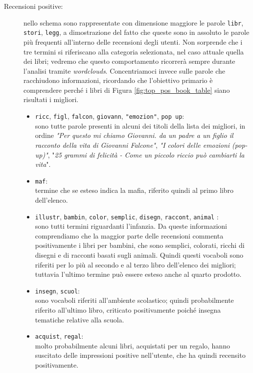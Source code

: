 				\begin{description}
					\item[Recensioni positive:]
					 nello schema sono rappresentate con dimensione maggiore le parole \verb|libr|, \verb|stori|, \verb|legg|, a dimostrazione del fatto che queste sono in assoluto le parole più frequenti all'interno delle recensioni degli utenti. Non sorprende che i tre termini si riferiscano alla categoria selezionata, nel caso attuale quella dei libri; vedremo che questo comportamento ricorrerà sempre durante l'analisi tramite \textit{wordclouds}. Concentriamoci invece sulle parole che racchiudono informazioni, ricordando che l'obiettivo primario è comprendere perché i libri di Figura \ref{fig:top_pos_book_table} siano risultati i migliori.
					\begin{itemize}
						\item \texttt{ricc}, \texttt{figl}, \texttt{falcon},  \texttt{giovann}, \texttt{"emozion"}, \texttt{pop up}: \\
						sono tutte parole presenti in alcuni dei titoli della lista dei migliori, in ordine \textit{"Per questo mi chiamo Giovanni. da un padre a un figlio il racconto della vita di Giovanni Falcone"}, \textit{"I colori delle emozioni (pop-up)"}, "\textit{25 grammi di felicità - Come un piccolo riccio può cambiarti la vita}". 
						\item \texttt{maf}: \\
						termine che se esteso indica la mafia, riferito quindi al primo libro dell'elenco.
						\item \texttt{illustr}, \texttt{bambin}, \texttt{color}, \texttt{semplic},  \texttt{disegn}, \texttt{raccont}, \texttt{animal} : \\
						sono tutti termini riguardanti l'infanzia. Da queste informazioni comprendiamo che la maggior parte delle recensioni commenta positivamente i libri per bambini, che sono semplici, colorati, ricchi di disegni e di racconti basati sugli animali. Quindi questi vocaboli sono riferiti per lo più al secondo e al terzo libro dell'elenco dei migliori; tuttavia l'ultimo termine può essere esteso anche al quarto prodotto. 
						\item \texttt{insegn}, \texttt{scuol}: \\
						sono vocaboli riferiti all'ambiente scolastico; quindi probabilmente riferito all'ultimo libro, criticato positivamente poiché insegna tematiche relative alla scuola.
						\item \texttt{acquist}, \texttt{regal}: \\
						molto probabilmente alcuni libri, acquistati per un regalo, hanno suscitato delle impressioni positive nell'utente, che ha quindi recensito positivamente.
					\end{itemize}	
				

\end{description}
